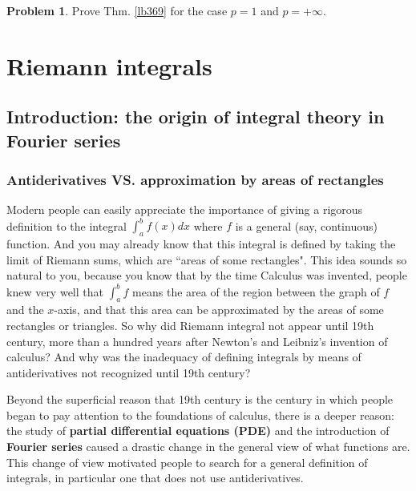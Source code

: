 \documentclass[12pt,b5paper,notitlepage]{article}
\theoremstyle{definition}
\newtheorem{prob}{\color{red}Problem}[section]
\theoremstyle{plain}
\numberwithin{equation}{section}
\begin{document}
\begin{prob}
Prove Thm. \ref{lb369} for the case $p=1$ and $p=+\infty$.
\end{prob}












\newpage



\section{Riemann integrals}



\subsection{Introduction: the origin of integral theory in Fourier series}



\subsubsection{Antiderivatives VS. approximation by areas of rectangles}

Modern people can easily appreciate the importance of giving a rigorous definition to the integral $\int_a^bf(x)dx$ where $f$ is a general (say, continuous) function. And you may already know that this integral is defined by taking the limit of Riemann sums, which are ``areas of some rectangles". This idea sounds so natural to you, because you know that by the time Calculus was invented, people knew very well that  $\int_a^b f$ means the area of the region between the graph of $f$ and the $x$-axis, and that this area can be approximated by the areas of some rectangles or triangles. So why did Riemann integral not appear until 19th century, more than a hundred years after Newton's and Leibniz's invention of calculus? And why was the inadequacy of defining integrals by means of antiderivatives not recognized until 19th century?


Beyond the superficial reason that 19th century is the century in which people began to pay attention to the foundations of calculus, there is a deeper reason: the study of \textbf{partial differential equations (PDE)} and the introduction of \textbf{Fourier series} caused a drastic change in the general view of what functions are. This change of view motivated people to search for a general definition of integrals, in particular one that does not use antiderivatives.
\end{document}
